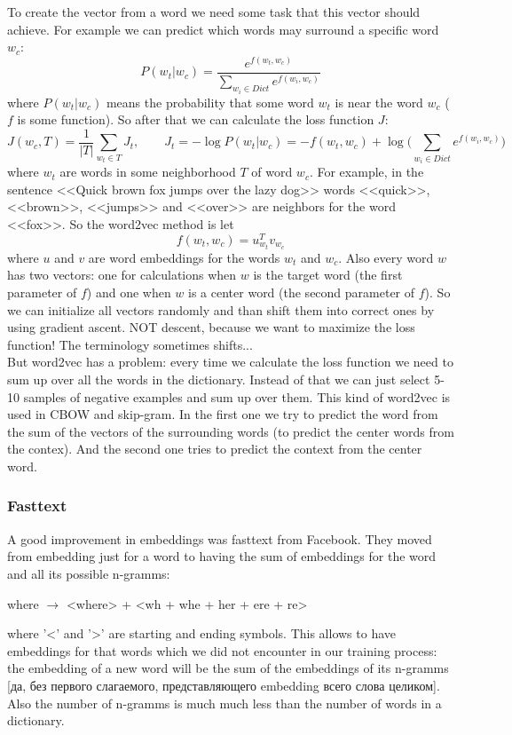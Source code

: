 To create the vector from a word we need some task that this vector should achieve. For example we can predict which words may surround a specific word $w_c$:
$$P(w_t|w_c)=\frac{e^{f(w_t,w_c)}}{\sum\limits_{w_i\in Dict}e^{f(w_i,w_c)}}$$
where $P(w_t|w_c)$ means the probability that some word $w_t$ is near the word $w_c$ ($f$ is some function). So after that we can calculate the loss function $J$:
$$J(w_c, T)=\frac{1}{|T|}\sum\limits_{w_t\in T}J_t,\qquad J_t=-\log P(w_t|w_c)=-f(w_t,w_c)+\log\Big(\sum\limits_{w_i\in Dict}e^{f(w_i,w_c)}\Big)$$
where $w_t$ are words in some neighborhood $T$ of word $w_c$. For example, in the sentence <<Quick brown fox jumps over the lazy dog>> words <<quick>>, <<brown>>, <<jumps>> and <<over>> are neighbors for the word <<fox>>. So the word2vec method is let
$$f(w_t,w_c)=u_{w_t}^Tv_{w_c}$$
where $u$ and $v$ are word embeddings for the words $w_t$ and $w_c$. Also every word $w$ has two vectors: one for calculations when $w$ is the target word (the first parameter of $f$) and one when $w$ is a center word (the second parameter of $f$). So we can initialize all vectors randomly and than shift them into correct ones by using gradient ascent. NOT descent, because we want to maximize the loss function! The terminology sometimes shifts...\\
But word2vec has a problem: every time we calculate the loss function we need to sum up over all the words in the dictionary. Instead of that we can just select 5-10 samples of negative examples and sum up over them. This kind of word2vec is used in CBOW and skip-gram. In the first one we try to predict the word from the sum of the vectors of the surrounding words (to predict the center words from the contex). And the second one tries to predict the context from the center word.

\subsubsection*{Fasttext}

A good improvement in embeddings was fasttext from Facebook. They moved from embedding just for a word to having the sum of embeddings for the word and all its possible n-gramms:
\begin{center}
	where $\to$ <where> + <wh + whe + her + ere + re>
\end{center}
where '<' and '>' are starting and ending symbols. This allows to have embeddings for that words which we did not encounter in our training process: the embedding of a new word will be the sum of the embeddings of its n-gramms [да, без первого слагаемого, представляющего embedding всего слова целиком]. Also the number of n-gramms is much much less than the number of words in a dictionary.

